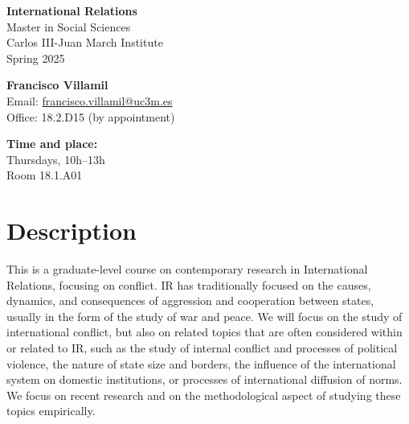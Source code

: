 \documentclass[12pt, a4paper]{article}
\begin{document}
\begin{center}
{\LARGE\bf International Relations}\\\vspace{10pt}
Master in Social Sciences\\Carlos III-Juan March Institute\\
\vspace{10pt}
{\large Spring 2025}\\
\end{center}

\vspace{15pt}

\begin{minipage}{0.6\textwidth}
\textbf{Francisco Villamil}\\
Email: \href{francisco.villamil@uc3m.es}{francisco.villamil@uc3m.es}\\
Office: 18.2.D15 (by appointment)
\end{minipage}\hfill
\begin{minipage}{0.39\textwidth}
\centering
\textbf{Time and place:}\\
Thursdays, 10h--13h\\Room 18.1.A01
\end{minipage}


\section{Description}

This is a graduate-level course on contemporary research in International Relations, focusing on conflict. IR has traditionally focused on the causes, dynamics, and consequences of aggression and cooperation between states, usually in the form of the study of war and peace.
We will focus on the study of international conflict, but also on related topics that are often considered within or related to IR, such as the study of internal conflict and processes of political violence, the nature of state size and borders, the influence of the international system on domestic institutions, or processes of international diffusion of norms.
We focus on recent research and on the methodological aspect of studying these topics empirically.
\end{document}
